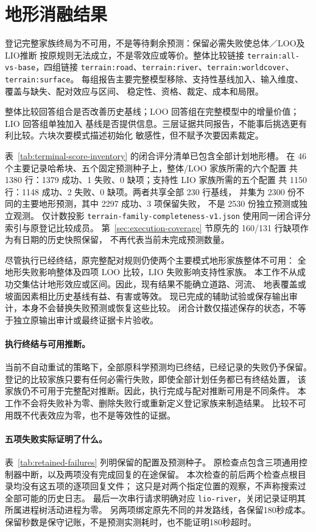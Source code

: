 \section{地形消融结果}
\label{sec:terrain-results}\hypertarget{sec:terrain-results}{}
登记完整家族终局为不可用，不是等待剩余预测：保留必需失败使总体／LOO及LIO推断
按原规则无法成立，不是零效应或等价。整体比较链接 \texttt{terrain:all-vs-base}，四组链接
\texttt{terrain:road}、\texttt{terrain:river}、\texttt{terrain:worldcover}、\texttt{terrain:surface}。
每组报告主要完整模型移除、支持性基线加入、输入维度、覆盖与缺失、配对效应与区间、
稳定性、资格、裁定、成本和局限。

整体比较回答组合是否改善历史基线；LOO 回答组在完整模型中的增量价值；LIO 回答组单独加入
基线是否提供信息。三层证据共同报告，不能事后挑选更有利比较。六块次要模式描述初始化
敏感性，但不赋予次要因素裁定。

表~\ref{tab:terminal-score-inventory} 的闭合评分清单已包含全部计划地形槽。
在 46 个主要记录哈希块、五个固定预测种子上，整体/LOO 家族所需的六个配置
共 1380 行：1379 成功、1 失败、0 缺项；支持性 LIO 家族所需的五个配置
共 1150 行：1148 成功、2 失败、0 缺项。两者共享全部 230 行基线，
并集为 2300 份不同的主要地形预测，其中 2297 成功、3 项保留失败，
不是 2530 份独立预测或独立观测。
仅计数投影 \texttt{terrain-family-completeness-v1.json} 使用同一闭合评分索引与原登记比较成员。
第~\ref{sec:execution-coverage} 节原先的 160/131 行缺项作为有日期的历史快照保留，
不再代表当前未完成预测数量。

尽管执行已经终结，原完整配对规则仍使两个主要模式地形家族整体不可用：
全地形失败影响整体及四项 LOO 比较，LIO 失败影响支持性家族。
本工作不从成功交集估计地形效应或区间。因此，现有结果不能确立道路、河流、
地表覆盖或坡面因素相比历史基线有益、有害或等效。
现已完成的辅助试验或保存输出审计，本身不会替换失败预测或恢复这些比较。
闭合计数仅描述保存的状态，不等于独立原输出审计或最终证据卡片验收。

\paragraph{执行终结与可用推断。}
\label{sec:terminal-failures}\hypertarget{sec:terminal-failures}{}
当前不自动重试的策略下，全部原科学预测均已终结，已经记录的失败仍予保留。
登记的比较家族只要有任何必需行失败，即使全部计划任务都已有终结处置，
该家族仍不可用于完整配对推断。因此，执行完成与配对推断可用是不同条件。
本工作不会将失败补为零、删除失败行或重新定义登记家族来制造结果。
比较不可用既不代表效应为零，也不是等效性的证据。

\paragraph{五项失败实际证明了什么。}
表~\ref{tab:retained-failures} 列明保留的配置及预测种子。
原检查点包含三项通用控制器中断，以及两项没有完成回复的在途保留。
本次检查的前后两个检查点根目录均没有这五项的逐项回复文件；
这只是对两个指定位置的观察，不声称搜索过全部可能的历史日志。
最后一次串行请求明确对应 \texttt{lio-river}，关闭记录证明其所属进程树活动进程为零。
另两项绑定原先不同的并发路线，各保留180秒成本。
保留秒数是保守记账，不是预测实测耗时，也不能证明180秒超时。

